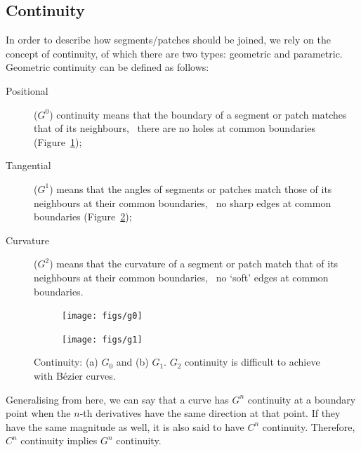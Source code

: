 \subsection{Continuity}

In order to describe how segments/patches should be joined, we rely on the concept of continuity, of which there are two types: geometric and parametric.
Geometric continuity can be defined as follows:

\begin{description}
\item[Positional] (\(G^0\)) continuity means that the boundary of a segment or patch matches that of its neighbours, \ie\ there are no holes at common boundaries (Figure~\ref{subfig:g0});
\item[Tangential] (\(G^1\)) means that the angles of segments or patches match those of its neighbours at their common boundaries, \ie\ no sharp edges at common boundaries (Figure~\ref{subfig:g1});
\item[Curvature] (\(G^2\)) means that the curvature of a segment or patch match that of its neighbours at their common boundaries, \ie\ no `soft' edges at common boundaries.
\end{description}

\begin{figure}
\centering
\begin{subfigure}{0.4\linewidth}
\texttt{[image: figs/g0]}
\caption{}%
\label{subfig:g0}
\end{subfigure}%
\begin{subfigure}{0.4\linewidth}
\texttt{[image: figs/g1]}
\caption{}%
\label{subfig:g1}
\end{subfigure}%
\caption{Continuity: (a) \(G_0\) and (b) \(G_1\). \(G_2\) continuity is difficult to achieve with B\'ezier curves.}%
\label{fig:g}
\end{figure}

Generalising from here, we can say that a curve has \(G^n\) continuity at a boundary point when the \(n\)-th derivatives have the same direction at that point.
If they have the same magnitude as well, it is also said to have \(C^n\) continuity.
Therefore, \(C^n\) continuity implies \(G^n\) continuity.


